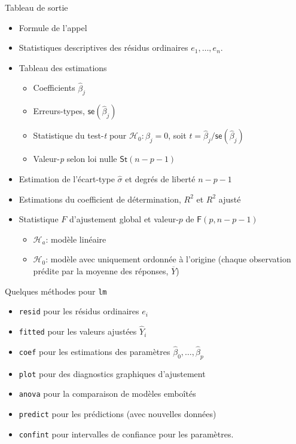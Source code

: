 \documentclass[
  ignorenonframetext,
]{beamer}
\providecommand{\tightlist}{%
  \setlength{\itemsep}{0pt}\setlength{\parskip}{0pt}}\usepackage{longtable,booktabs,array}
\begin{document}
\begin{frame}{Tableau de sortie}
\protect\hypertarget{tableau-de-sortie}{}
\begin{itemize}
\tightlist
\item
  Formule de l'appel
\item
  Statistiques descriptives des résidus ordinaires \(e_1, \ldots, e_n\).
\item
  Tableau des estimations

  \begin{itemize}
  \tightlist
  \item
    Coefficients \(\widehat{\beta}_j\)
  \item
    Erreurs-types, \(\mathsf{se}(\widehat{\beta}_j)\)
  \item
    Statistique du test-\emph{t} pour \(\mathscr{H}_0: \beta_j=0\), soit
    \(t=\widehat{\beta}_j/\mathsf{se}(\widehat{\beta}_j)\)
  \item
    Valeur-\emph{p} selon loi nulle \(\mathsf{St}(n-p-1)\)
  \end{itemize}
\item
  Estimation de l'écart-type \(\widehat{\sigma}\) et degrés de liberté
  \(n-p-1\)
\item
  Estimations du coefficient de détermination, \(R^2\) et \(R^2\) ajusté
\item
  Statistique \(F\) d'ajustement global et valeur-\(p\) de
  \(\mathsf{F}(p, n - p - 1)\)

  \begin{itemize}
  \tightlist
  \item
    \(\mathscr{H}_a\): modèle linéaire
  \item
    \(\mathscr{H}_0\): modèle avec uniquement ordonnée à l'origine
    (chaque observation prédite par la moyenne des réponses,
    \(\overline{Y}\))
  \end{itemize}
\end{itemize}

\normalsize
\end{frame}

\begin{frame}[fragile]{Quelques méthodes pour \texttt{lm}}
\protect\hypertarget{quelques-muxe9thodes-pour-lm}{}
\begin{itemize}
\tightlist
\item
  \texttt{resid} pour les résidus ordinaires \(e_i\)
\item
  \texttt{fitted} pour les valeurs ajustées \(\widehat{Y}_i\)
\item
  \texttt{coef} pour les estimations des paramètres
  \(\widehat{\beta}_0, \ldots, \widehat{\beta}_p\)
\item
  \texttt{plot} pour des diagnostics graphiques d'ajustement
\item
  \texttt{anova} pour la comparaison de modèles emboîtés
\item
  \texttt{predict} pour les prédictions (avec nouvelles données)
\item
  \texttt{confint} pour intervalles de confiance pour les paramètres.
\end{itemize}
\end{frame}
\end{document}
